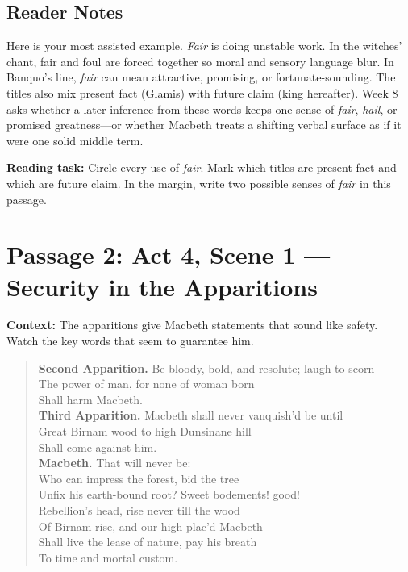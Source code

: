 \documentclass[12pt]{article}
\newenvironment{playpassage}{\begin{quote}\small\setlength{\parskip}{0.12em}\setlength{\parindent}{0pt}}{\end{quote}}
\newcommand{\speaker}[1]{\textbf{#1.}}
\begin{document}
\subsection*{Reader Notes}

Here is your most assisted example. \textit{Fair} is doing unstable work. In the witches' chant, fair and foul are forced together so moral and sensory language blur. In Banquo's line, \textit{fair} can mean attractive, promising, or fortunate-sounding. The titles also mix present fact (Glamis) with future claim (king hereafter). Week 8 asks whether a later inference from these words keeps one sense of \textit{fair}, \textit{hail}, or promised greatness---or whether Macbeth treats a shifting verbal surface as if it were one solid middle term.

\textbf{Reading task:} Circle every use of \textit{fair}. Mark which titles are present fact and which are future claim. In the margin, write two possible senses of \textit{fair} in this passage.

\newpage

\section*{Passage 2: Act 4, Scene 1 --- Security in the Apparitions}

\textbf{Context:} The apparitions give Macbeth statements that sound like safety. Watch the key words that seem to guarantee him.

\begin{playpassage}
\speaker{Second Apparition} Be bloody, bold, and resolute; laugh to scorn\\
The power of man, for none of woman born\\
Shall harm Macbeth.\\
\speaker{Third Apparition} Macbeth shall never vanquish'd be until\\
Great Birnam wood to high Dunsinane hill\\
Shall come against him.\\
\speaker{Macbeth} That will never be:\\
Who can impress the forest, bid the tree\\
Unfix his earth-bound root? Sweet bodements! good!\\
Rebellion's head, rise never till the wood\\
Of Birnam rise, and our high-plac'd Macbeth\\
Shall live the lease of nature, pay his breath\\
To time and mortal custom.
\end{playpassage}
\end{document}
